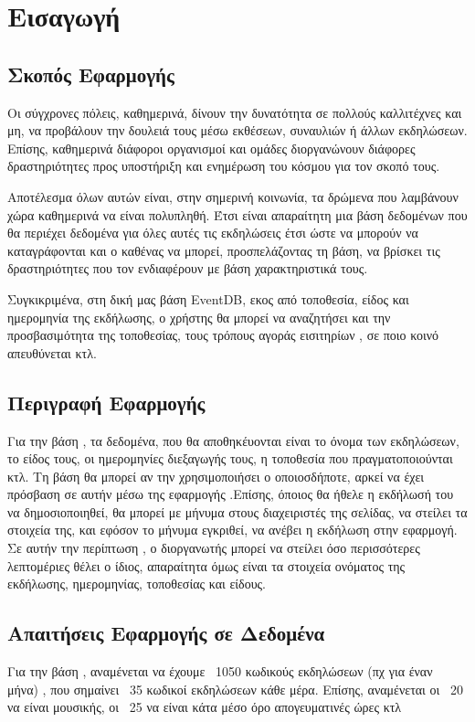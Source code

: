 \section{Εισαγωγή}

\subsection{Σκοπός Εφαρμογής}

\par Οι σύγχρονες πόλεις, καθημερινά, δίνουν την δυνατότητα σε πολλούς καλλιτέχνες και μη,
να προβάλουν την δουλειά τους μέσω εκθέσεων, συναυλιών ή άλλων εκδηλώσεων. Επίσης, καθημερινά διάφοροι οργανισμοί και ομάδες διοργανώνουν διάφορες δραστηριότητες προς υποστήριξη και ενημέρωση του κόσμου για τον σκοπό τους. 
\par Αποτέλεσμα όλων αυτών είναι, στην σημερινή κοινωνία, τα δρώμενα που λαμβάνουν χώρα καθημερινά να είναι πολυπληθή. Έτσι είναι απαραίτητη μια βάση δεδομένων που θα περιέχει δεδομένα για όλες αυτές τις εκδηλώσεις έτσι ώστε να μπορούν να καταγράφονται και ο καθένας να μπορεί, προσπελάζοντας τη βάση, να βρίσκει τις δραστηριότητες που τον ενδιαφέρουν με βάση χαρακτηριστικά τους.
\par Συγκικριμένα, στη δική μας βάση EventDB, εκος από τοποθεσία, είδος και ημερομηνία της εκδήλωσης, ο χρήστης θα μπορεί να αναζητήσει και την προσβασιμότητα της τοποθεσίας, τους τρόπους αγοράς εισιτηρίων , σε ποιο κοινό απευθύνεται κτλ. 

\subsection{Περιγραφή Εφαρμογής}

\par Για την βάση \titlos, τα δεδομένα, που θα αποθηκέυονται είναι το όνομα των εκδηλώσεων, το είδος τους,  οι ημερομηνίες διεξαγωγής τους, η τοποθεσία που πραγματοποιούνται κτλ. Τη βάση θα μπορεί αν την χρησιμοποιήσει ο οποιοσδήποτε, αρκεί να έχει πρόσβαση σε αυτήν μέσω της εφαρμογής .Επίσης, όποιος θα ήθελε η εκδήλωσή του να δημοσιοποιηθεί, θα μπορεί με μήνυμα στους διαχειριστές της σελίδας, να στείλει τα στοιχεία της, και εφόσον το μήνυμα εγκριθεί, να ανέβει η εκδήλωση στην εφαρμογή. Σε αυτήν την περίπτωση , ο διοργανωτής μπορεί να στείλει όσο περισσότερες λεπτομέριες θέλει ο ίδιος, απαραίτητα όμως είναι τα στοιχεία ονόματος της εκδήλωσης, ημερομηνίας, τοποθεσίας και είδους.

\subsection{Απαιτήσεις Εφαρμογής σε Δεδομένα}

\par Για την βάση \titlos, αναμένεται να έχουμε ~1050 κωδικούς εκδηλώσεων (πχ για έναν μήνα) , που σημαίνει ~35 κωδικοί εκδηλώσεων κάθε μέρα. Επίσης, αναμένεται οι ~20 να είναι μουσικής, οι ~25 να είναι κάτα μέσο όρο απογευματινές ώρες κτλ




